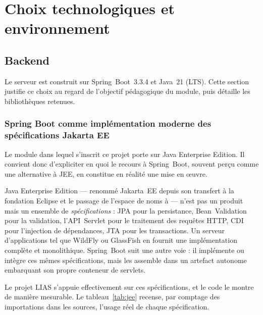 \chapter{Choix technologiques et environnement}
\label{ch:techno}

\section{Backend}

Le serveur est construit sur Spring~Boot~3.3.4 et Java~21 (LTS). Cette section justifie ce
choix au regard de l'objectif pédagogique du module, puis détaille les bibliothèques
retenues.

\subsection{Spring Boot comme implémentation moderne des spécifications Jakarta EE}
\label{sec:jee}

Le module dans lequel s'inscrit ce projet porte sur Java Enterprise Edition. Il convient
donc d'expliciter en quoi le recours à Spring~Boot, souvent perçu comme une alternative à
JEE, en constitue en réalité une mise en œuvre.

Java Enterprise Edition --- renommé Jakarta~EE depuis son transfert à la fondation Eclipse
et le passage de l'espace de noms  à  --- n'est pas un produit
mais un ensemble de \emph{spécifications} : JPA pour la persistance, Bean~Validation pour
la validation, l'API~Servlet pour le traitement des requêtes HTTP, CDI pour l'injection de
dépendances, JTA pour les transactions. Un serveur d'applications tel que WildFly ou
GlassFish en fournit une implémentation complète et monolithique. Spring~Boot suit une
autre voie : il implémente ou intègre ces mêmes spécifications, mais les assemble dans un
artefact autonome embarquant son propre conteneur de servlets.

Le projet LIAS s'appuie effectivement sur ces spécifications, et le code le montre de
manière mesurable. Le tableau~\ref{tab:jee} recense, par comptage des importations dans
les sources, l'usage réel de chaque spécification.


